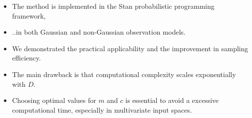\documentclass[8pt]{beamer} %
\begin{document}
\begin{frame}

\begin{itemize}\setlength\itemsep{2mm}

\item The method is implemented in the Stan probabilistic programming framework,

\item ..in both Gaussian and non-Gaussian observation models.

\item We demonstrated the practical applicability and the improvement in sampling efficiency.

\item The main drawback is that computational complexity scales exponentially with $D$. 

\item Choosing optimal values for $m$ and $c$ is essential to avoid a excessive computational time, especially in multivariate input spaces. 



\end{itemize}
\end{frame}

\end{document}
